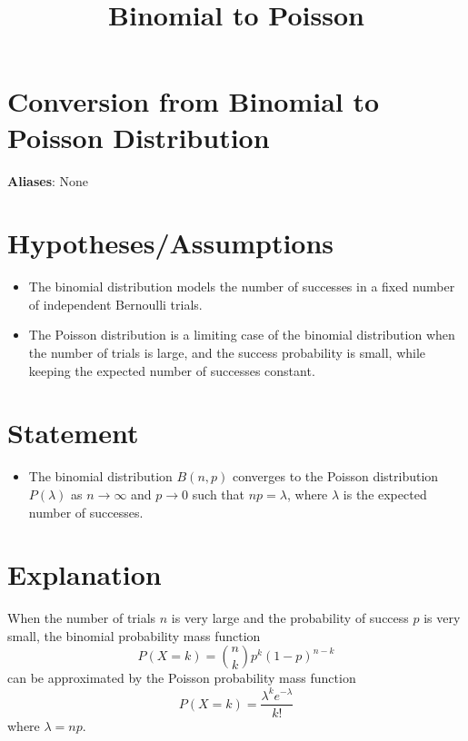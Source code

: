 \documentclass{article}
\title{Binomial to Poisson}
\author{}
\date{}
\begin{document}
\maketitle

\section*{Conversion from Binomial to Poisson Distribution}
\textbf{Aliases}: None

\section*{Hypotheses/Assumptions}
\begin{itemize}
    \item The binomial distribution models the number of successes in a fixed number of independent Bernoulli trials.
    \item The Poisson distribution is a limiting case of the binomial distribution when the number of trials is large, and the success probability is small, while keeping the expected number of successes constant.
\end{itemize}

\section*{Statement}
\begin{itemize}
    \item The binomial distribution $B(n, p)$ converges to the Poisson distribution $P(\lambda)$ as $n \to \infty$ and $p \to 0$ such that $np = \lambda$, where $\lambda$ is the expected number of successes.
\end{itemize}

\section*{Explanation}
When the number of trials $n$ is very large and the probability of success $p$ is very small, the binomial probability mass function
\[
P(X = k) = \binom{n}{k} p^k (1 - p)^{n - k}
\]
can be approximated by the Poisson probability mass function
\[
P(X = k) = \frac{\lambda^k e^{-\lambda}}{k!}
\]
where $\lambda = np$.
\end{document}

